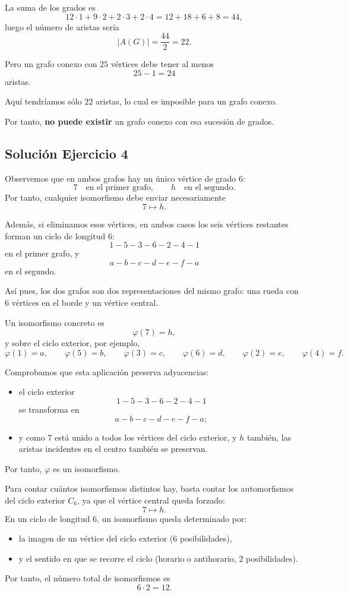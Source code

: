 \documentclass[12pt]{article}
\begin{document}
\begin{enumerate}
    La suma de los grados es
    \[
    12\cdot 1+9\cdot 2+2\cdot 3+2\cdot 4
    =12+18+6+8=44,
    \]
    luego el número de aristas sería
    \[
    |A(G)|=\frac{44}{2}=22.
    \]

    Pero un grafo conexo con $25$ vértices debe tener al menos
    \[
    25-1=24
    \]
    aristas.

    Aquí tendríamos sólo $22$ aristas, lo cual es imposible para un grafo conexo.

    Por tanto, \textbf{no puede existir} un grafo conexo con esa sucesión de grados.
\end{enumerate}

\subsection*{Solución Ejercicio 4}

Observemos que en ambos grafos hay un único vértice de grado $6$:
\[
7 \quad \text{en el primer grafo}, \qquad h \quad \text{en el segundo.}
\]
Por tanto, cualquier isomorfismo debe enviar necesariamente
\[
7 \longmapsto h.
\]

Además, si eliminamos esos vértices, en ambos casos los seis vértices restantes forman un ciclo de longitud $6$:
\[
1-5-3-6-2-4-1
\]
en el primer grafo, y
\[
a-b-c-d-e-f-a
\]
en el segundo.

Así pues, los dos grafos son dos representaciones del mismo grafo: una rueda con $6$ vértices en el borde y un vértice central.

Un isomorfismo concreto es
\[
\varphi(7)=h,
\]
y sobre el ciclo exterior, por ejemplo,
\[
\varphi(1)=a,\qquad
\varphi(5)=b,\qquad
\varphi(3)=c,\qquad
\varphi(6)=d,\qquad
\varphi(2)=e,\qquad
\varphi(4)=f.
\]

Comprobamos que esta aplicación preserva adyacencias:
\begin{itemize}
    \item el ciclo exterior
    \[
    1-5-3-6-2-4-1
    \]
    se transforma en
    \[
    a-b-c-d-e-f-a;
    \]
    \item y como $7$ está unido a todos los vértices del ciclo exterior, y $h$ también, las aristas incidentes en el centro también se preservan.
\end{itemize}
Por tanto, $\varphi$ es un isomorfismo.

\medskip

Para contar cuántos isomorfismos distintos hay, basta contar los automorfismos del ciclo exterior $C_6$, ya que el vértice central queda forzado:
\[
7 \mapsto h.
\]
En un ciclo de longitud $6$, un isomorfismo queda determinado por:
\begin{itemize}
    \item la imagen de un vértice del ciclo exterior ($6$ posibilidades),
    \item y el sentido en que se recorre el ciclo (horario o antihorario, $2$ posibilidades).
\end{itemize}
Por tanto, el número total de isomorfismos es
\[
6\cdot 2 = 12.
\]
\end{document}
